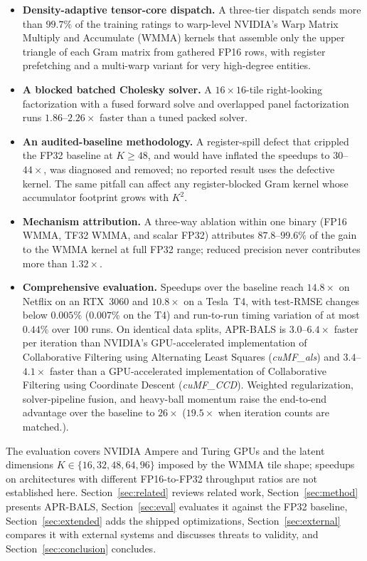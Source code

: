 \begin{itemize}
\item \textbf{Density-adaptive tensor-core dispatch.} A three-tier dispatch sends more than $99.7\%$ of the training ratings to warp-level NVIDIA's Warp Matrix Multiply and Accumulate (WMMA) kernels that assemble only the upper triangle of each Gram matrix from gathered FP16 rows, with register prefetching and a multi-warp variant for very high-degree entities.
\item \textbf{A blocked batched Cholesky solver.} A $16 \times 16$-tile right-looking factorization with a fused forward solve and overlapped panel factorization runs $1.86$--$2.26\times$ faster than a tuned packed solver.
\item \textbf{An audited-baseline methodology.} A register-spill defect that crippled the FP32 baseline at $K \ge 48$, and would have inflated the speedups to $30$--$44\times$, was diagnosed and removed; no reported result uses the defective kernel. The same pitfall can affect any register-blocked Gram kernel whose accumulator footprint grows with $K^{2}$.
\item \textbf{Mechanism attribution.} A three-way ablation within one binary (FP16 WMMA, TF32 WMMA, and scalar FP32) attributes $87.8$--$99.6\%$ of the gain to the WMMA kernel at full FP32 range; reduced precision never contributes more than $1.32\times$.
\item \textbf{Comprehensive evaluation.} Speedups over the baseline reach $14.8\times$ on Netflix on an RTX~3060 and $10.8\times$ on a Tesla~T4, with test-RMSE changes below $0.005\%$ ($0.007\%$ on the T4) and run-to-run timing variation of at most $0.44\%$ over 100 runs. On identical data splits, APR-BALS is $3.0$--$6.4\times$ faster per iteration than NVIDIA's GPU-accelerated implementation of Collaborative Filtering using Alternating Least Squares (\textit{cuMF\_als})\cite{tan2016faster} and $3.4$--$4.1\times$ faster than a GPU-accelerated implementation of Collaborative Filtering using Coordinate Descent (\textit{cuMF\_CCD})\cite{yu2012scalable,nisa2017parallel}. Weighted regularization, solver-pipeline fusion, and heavy-ball momentum raise the end-to-end advantage over the baseline to $26\times$ ($19.5\times$ when iteration counts are matched.).
\end{itemize}

The evaluation covers NVIDIA Ampere and Turing GPUs and the latent dimensions $K \in \{16, 32, 48, 64, 96\}$ imposed by the WMMA tile shape; speedups on architectures with different FP16-to-FP32 throughput ratios are not established here. Section~\ref{sec:related} reviews related work, Section~\ref{sec:method} presents APR-BALS, Section~\ref{sec:eval} evaluates it against the FP32 baseline, Section~\ref{sec:extended} adds the shipped optimizations, Section~\ref{sec:external} compares it with external systems and discusses threats to validity, and Section~\ref{sec:conclusion} concludes.
